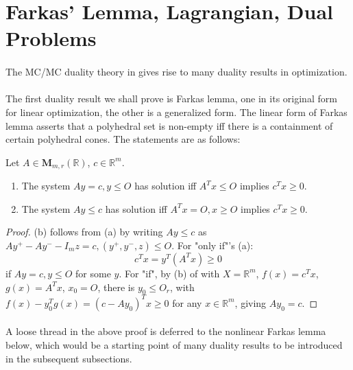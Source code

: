 \section{Farkas' Lemma, Lagrangian, Dual Problems}
\label{sect:041}

\paragraph{}The MC/MC duality theory in  gives rise to many duality results in optimization.

\paragraph{}The first duality result we shall prove is Farkas lemma, one in its original form for linear optimization, the other is a generalized form. The linear form of Farkas lemma asserts that a polyhedral set is non-empty iff there is a containment of certain polyhedral cones. The statements are as follows:

\begin{prop}\label{prop:041-farkas-lemma-linear}
	Let $A\in \mathbf{M}_{m,r}(\mathbb{R})$, $c\in \mathbb{R}^m$.
	\begin{enumerate}[label=(\alph*)]
		\item The system $Ay=c,y\leq O$ has solution iff $A^Tx\leq O$ implies $c^Tx\geq 0$.
		\item The system $Ay\leq c$ has solution iff $A^Tx=O,x\geq O$ implies $c^Tx\geq 0$.
	\end{enumerate}
\end{prop}

\begin{proof}
	(b) follows from (a) by writing $Ay\leq c$ as $Ay^+-Ay^--I_mz=c,(y^+,y^-,z)\leq O$. For "only if"'s (a):
	\[
		c^Tx=y^T(A^Tx)\geq 0
	\]
	if $Ay=c,y\leq O$ for some $y$. For "if", by (b) of  with $X=\mathbb{R}^m$, $f(x)=c^Tx$, $g(x)=A^Tx$, $x_0=O$, there is $y_0\leq O_r$, with $f(x)-y_0^Tg(x)=(c-Ay_0)^Tx\geq 0$ for any $x\in \mathbb{R}^m$, giving $Ay_0=c$.
\end{proof}

\paragraph{}A loose thread in the above proof is deferred to the nonlinear Farkas lemma below, which would be a starting point of many duality results to be introduced in the subsequent subsections.

